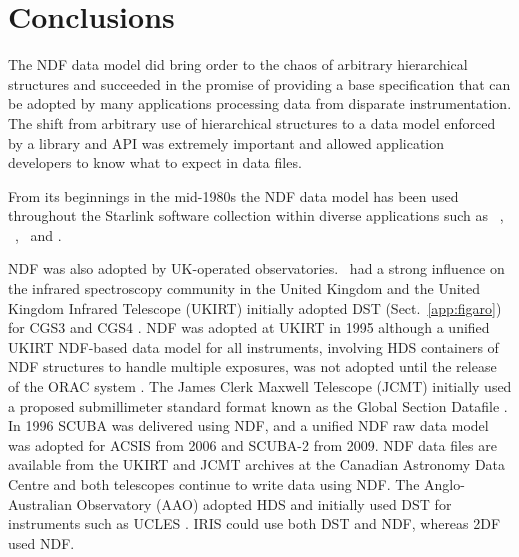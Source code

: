 \documentclass[final,authoryear,5p,times,twocolumn]{elsarticle}
\newcommand*\secref[1]{Sect.~\ref{#1}}
\begin{document}
\section{Conclusions}
\label{sec:conclusion}

The NDF data model did bring order to the chaos of arbitrary
hierarchical structures and succeeded in the promise of providing a
base specification that can be adopted by many applications processing
data from disparate instrumentation.  The shift from arbitrary use of
hierarchical structures to a data model enforced by a library and API
was extremely important and allowed application developers to know
what to expect in data files.

From its beginnings in the mid-1980s the NDF data model has been used
throughout the Starlink software collection within diverse
applications such as \smurf\ \citep{2013MNRAS.430.2545C}, \ccdpack\
\citep[][]{1993ESOC...47...39W,SUN139}, \gaia\ and
\KAPPA.

NDF was also adopted by UK-operated observatories.  \figaro\ had a
strong influence on the infrared spectroscopy community in the United
Kingdom and the United Kingdom Infrared Telescope (UKIRT) initially
adopted DST (\secref{app:figaro}) for CGS3 and CGS4
\citep{1993SPIE.1946..547W}. NDF was adopted at UKIRT in 1995 although
a unified UKIRT NDF-based data model for all instruments, involving
HDS containers of NDF structures to handle multiple exposures, was not
adopted until the release of the ORAC system
\citep{2000SPIE.4009..227B}. The James Clerk Maxwell Telescope (JCMT)
initially used a proposed submillimeter standard format known as the
Global Section Datafile \citep[GSD;][formerly General Single Dish
Data]{sun229}. In 1996 SCUBA \citep{1999MNRAS.303..659H} was delivered
using NDF, and a unified NDF raw data model was adopted for ACSIS
\citep{2009MNRAS.399.1026B} from 2006 and SCUBA-2
\citep{2013MNRAS.430.2513H} from 2009. NDF data files are available
from the UKIRT and JCMT archives at the Canadian Astronomy Data Centre
\citep{2008ASPC..394..450E,P01_adassxxiii,2014Economou} and both
telescopes continue to write data using NDF.  The
Anglo-Australian Observatory (AAO) adopted HDS and initially used
DST for instruments such as UCLES
\citep{1990SPIE.1235..562D}. IRIS \citep{1993PASAu..10..298A} could
use both DST and NDF, whereas 2DF \citep{2002MNRAS.333..279L}
used NDF.
\end{document}
